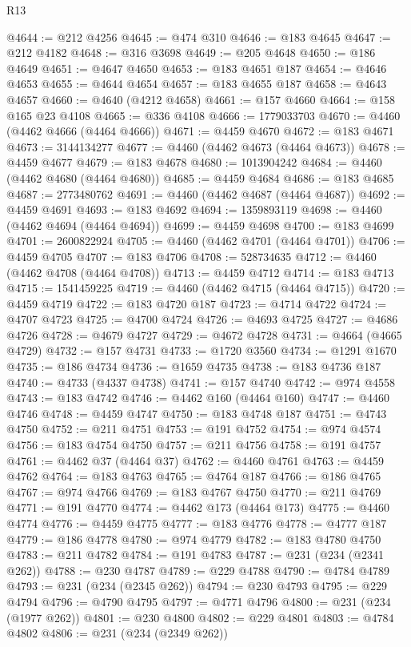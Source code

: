 \begin{lexlean}{R13}
\begin{coremodule}
@4644 := @212 @4256
@4645 := @474 @310
@4646 := @183 @4645
@4647 := @212 @4182
@4648 := @316 @3698
@4649 := @205 @4648
@4650 := @186 @4649
@4651 := @4647 @4650
@4653 := @183 @4651 @187
@4654 := @4646 @4653
@4655 := @4644 @4654
@4657 := @183 @4655 @187
@4658 := @4643 @4657
@4660 := @4640 (@4212 @4658)
@4661 := @157 @4660
@4664 := @158 @165 @23 @4108
@4665 := @336 @4108
@4666 := 1779033703
@4670 := @4460 (@4462 @4666 (@4464 @4666))
@4671 := @4459 @4670
@4672 := @183 @4671
@4673 := 3144134277
@4677 := @4460 (@4462 @4673 (@4464 @4673))
@4678 := @4459 @4677
@4679 := @183 @4678
@4680 := 1013904242
@4684 := @4460 (@4462 @4680 (@4464 @4680))
@4685 := @4459 @4684
@4686 := @183 @4685
@4687 := 2773480762
@4691 := @4460 (@4462 @4687 (@4464 @4687))
@4692 := @4459 @4691
@4693 := @183 @4692
@4694 := 1359893119
@4698 := @4460 (@4462 @4694 (@4464 @4694))
@4699 := @4459 @4698
@4700 := @183 @4699
@4701 := 2600822924
@4705 := @4460 (@4462 @4701 (@4464 @4701))
@4706 := @4459 @4705
@4707 := @183 @4706
@4708 := 528734635
@4712 := @4460 (@4462 @4708 (@4464 @4708))
@4713 := @4459 @4712
@4714 := @183 @4713
@4715 := 1541459225
@4719 := @4460 (@4462 @4715 (@4464 @4715))
@4720 := @4459 @4719
@4722 := @183 @4720 @187
@4723 := @4714 @4722
@4724 := @4707 @4723
@4725 := @4700 @4724
@4726 := @4693 @4725
@4727 := @4686 @4726
@4728 := @4679 @4727
@4729 := @4672 @4728
@4731 := @4664 (@4665 @4729)
@4732 := @157 @4731
@4733 := @1720 @3560
@4734 := @1291 @1670
@4735 := @186 @4734
@4736 := @1659 @4735
@4738 := @183 @4736 @187
@4740 := @4733 (@4337 @4738)
@4741 := @157 @4740
@4742 := @974 @4558
@4743 := @183 @4742
@4746 := @4462 @160 (@4464 @160)
@4747 := @4460 @4746
@4748 := @4459 @4747
@4750 := @183 @4748 @187
@4751 := @4743 @4750
@4752 := @211 @4751
@4753 := @191 @4752
@4754 := @974 @4574
@4756 := @183 @4754 @4750
@4757 := @211 @4756
@4758 := @191 @4757
@4761 := @4462 @37 (@4464 @37)
@4762 := @4460 @4761
@4763 := @4459 @4762
@4764 := @183 @4763
@4765 := @4764 @187
@4766 := @186 @4765
@4767 := @974 @4766
@4769 := @183 @4767 @4750
@4770 := @211 @4769
@4771 := @191 @4770
@4774 := @4462 @173 (@4464 @173)
@4775 := @4460 @4774
@4776 := @4459 @4775
@4777 := @183 @4776
@4778 := @4777 @187
@4779 := @186 @4778
@4780 := @974 @4779
@4782 := @183 @4780 @4750
@4783 := @211 @4782
@4784 := @191 @4783
@4787 := @231 (@234 (@2341 @262))
@4788 := @230 @4787
@4789 := @229 @4788
@4790 := @4784 @4789
@4793 := @231 (@234 (@2345 @262))
@4794 := @230 @4793
@4795 := @229 @4794
@4796 := @4790 @4795
@4797 := @4771 @4796
@4800 := @231 (@234 (@1977 @262))
@4801 := @230 @4800
@4802 := @229 @4801
@4803 := @4784 @4802
@4806 := @231 (@234 (@2349 @262))

\end{coremodule}
\end{lexlean}
